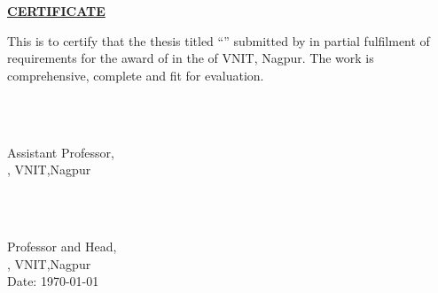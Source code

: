 \vspace{\baselineskip}




\begin{centering}
\textbf{\large{\underline{CERTIFICATE}}}\\
\end{centering}
This is to certify that the thesis titled ``\textbf{\thesisTitle}'' submitted by  \textbf{\yourName} in partial fulfilment of requirements for the award of {\yourDegree} in the {\yourCourse}  of VNIT, Nagpur. The work is comprehensive, complete and fit for evaluation. \\[1.25cm]

\begin{minipage}{0.4\textwidth}
	\begin{flushleft} \large
		\emph{}\\[2cm] %
	\end{flushleft}
\end{minipage}
\begin{minipage}{0.7\textwidth}
	{\begin{center} 
		\textbf{\yourSupName}\\
			{Assistant Professor,\\ 
			\normalsize{\yourSchool, VNIT,Nagpur}}
	\end{center}}
\end{minipage}\\[1cm]

\begin{minipage}{0.75\textwidth}
	{\begin{center} 
		
		\begin{flushleft}
		\textbf{\yourHodName}\\
			{Professor and Head,\\
			 \normalsize{\yourSchool, VNIT,Nagpur}\\
			Date: {\today}}
		\end{flushleft}
	\end{center}}
\end{minipage}

    
    

    
    



